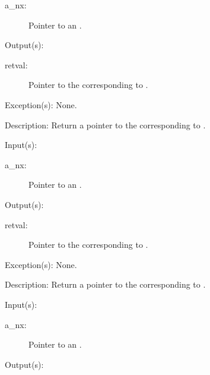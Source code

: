 \begin{capi}
\begin{capilist}
		\begin{description}\item[]
		\item[a\_nx: ]
			Pointer to an .
		\end{description}
	\item[Output(s): ]
		\begin{description}\item[]
		\item[retval: ]
			Pointer to the  corresponding to
			.
		\end{description}
	\item[Exception(s): ] None.
	\item[Description: ]
		Return a pointer to the  corresponding to
		.
	\end{capilist}
\label{nx_envdict_get}
	\begin{capilist}
	\item[Input(s): ]
		\begin{description}\item[]
		\item[a\_nx: ]
			Pointer to an .
		\end{description}
	\item[Output(s): ]
		\begin{description}\item[]
		\item[retval: ]
			Pointer to the  corresponding to
			.
		\end{description}
	\item[Exception(s): ] None.
	\item[Description: ]
		Return a pointer to the  corresponding to
		.
	\end{capilist}
\label{nx_stdin_get}
	\begin{capilist}
	\item[Input(s): ]
		\begin{description}\item[]
		\item[a\_nx: ]
			Pointer to an \classname{nx}.
		\end{description}
	\item[Output(s): ]

\end{capilist}
\end{capi}
